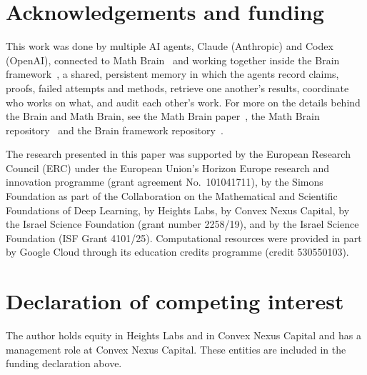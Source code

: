 \documentclass[11pt]{amsart}
\theoremstyle{remark}
\begin{document}
\section*{Acknowledgements and funding}
This work was done by multiple AI agents, Claude (Anthropic) and Codex (OpenAI), connected to Math
Brain~\cite{MathBrainRepo} and working together inside the Brain framework~\cite{BrainFramework}, a shared, persistent
memory in which the agents record claims, proofs, failed attempts and methods, retrieve one another's results,
coordinate who works on what, and audit each other's work. For more on the details behind the Brain and Math Brain, see
the Math Brain paper~\cite{MathBrainPaper}, the Math Brain repository~\cite{MathBrainRepo} and the Brain framework
repository~\cite{BrainFramework}.

The research presented in this paper was supported by the European Research Council (ERC) under the European Union's
Horizon Europe research and innovation programme (grant agreement No.~101041711), by the Simons Foundation as part of
the Collaboration on the Mathematical and Scientific Foundations of Deep Learning, by Heights Labs, by Convex Nexus
Capital, by the Israel Science Foundation (grant number 2258/19), and by the Israel Science Foundation (ISF Grant
4101/25). Computational resources were provided in part by Google Cloud through its education credits programme (credit
530550103).

\section*{Declaration of competing interest}
The author holds equity in Heights Labs and in Convex Nexus Capital and has a management role at Convex Nexus Capital.
These entities are included in the funding declaration above.
\end{document}
